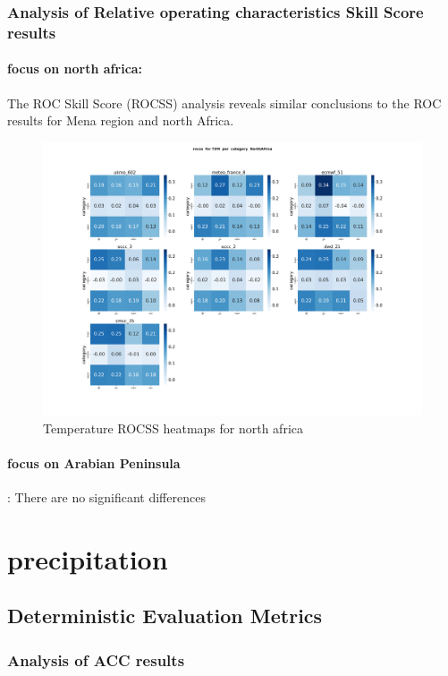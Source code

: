 \subsubsection{Analysis of Relative operating characteristics Skill Score results }
\paragraph{focus on north africa:}
The ROC Skill Score (ROCSS) analysis reveals similar conclusions to the ROC results for Mena region and north Africa. 
\begin{figure}[H]
\includegraphics[scale=0.3]{plots/prob/rocss/rocss_T2M_category_NorthAfrica.png}

\caption{Temperature ROCSS  heatmaps for north africa }
\end{figure}

\paragraph{focus on Arabian Peninsula}:
There are no significant differences



\section{precipitation}
\subsection{Deterministic Evaluation Metrics}
\subsubsection{Analysis of ACC results}
 
